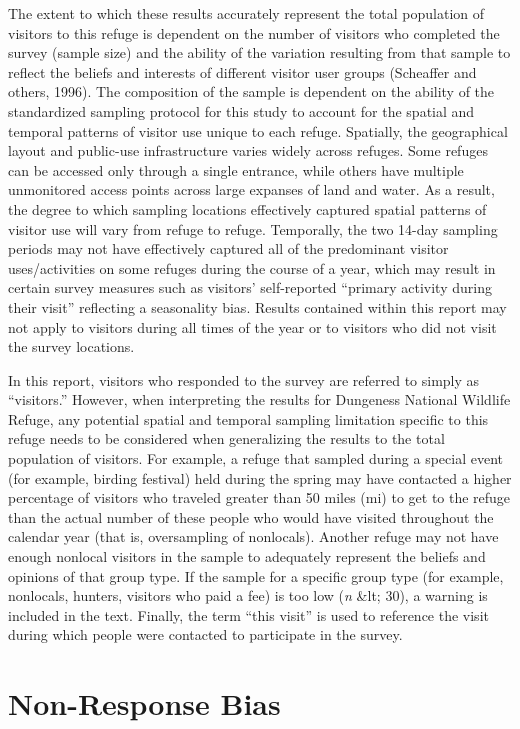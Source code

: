 \documentclass[]{book}
\begin{document}
The extent to which these results accurately represent the total
population of visitors to this refuge is dependent on the number of
visitors who completed the survey (sample size) and the ability of the
variation resulting from that sample to reflect the beliefs and
interests of different visitor user groups (Scheaffer and others, 1996).
The composition of the sample is dependent on the ability of the
standardized sampling protocol for this study to account for the spatial
and temporal patterns of visitor use unique to each refuge. Spatially,
the geographical layout and public-use infrastructure varies widely
across refuges. Some refuges can be accessed only through a single
entrance, while others have multiple unmonitored access points across
large expanses of land and water. As a result, the degree to which
sampling locations effectively captured spatial patterns of visitor use
will vary from refuge to refuge. Temporally, the two 14-day sampling
periods may not have effectively captured all of the predominant visitor
uses/activities on some refuges during the course of a year, which may
result in certain survey measures such as visitors' self-reported
``primary activity during their visit'' reflecting a seasonality bias.
Results contained within this report may not apply to visitors during
all times of the year or to visitors who did not visit the survey
locations.

In this report, visitors who responded to the survey are referred to
simply as ``visitors.'' However, when interpreting the results for
Dungeness National Wildlife Refuge, any potential spatial and temporal
sampling limitation specific to this refuge needs to be considered when
generalizing the results to the total population of visitors. For
example, a refuge that sampled during a special event (for example,
birding festival) held during the spring may have contacted a higher
percentage of visitors who traveled greater than 50 miles (mi) to get to
the refuge than the actual number of these people who would have visited
throughout the calendar year (that is, oversampling of nonlocals).
Another refuge may not have enough nonlocal visitors in the sample to
adequately represent the beliefs and opinions of that group type. If the
sample for a specific group type (for example, nonlocals, hunters,
visitors who paid a fee) is too low (\emph{n} \&lt; 30), a warning is
included in the text. Finally, the term ``this visit'' is used to
reference the visit during which people were contacted to participate in
the survey.

\section*{Non-Response Bias}\label{non-response-bias}
\end{document}
